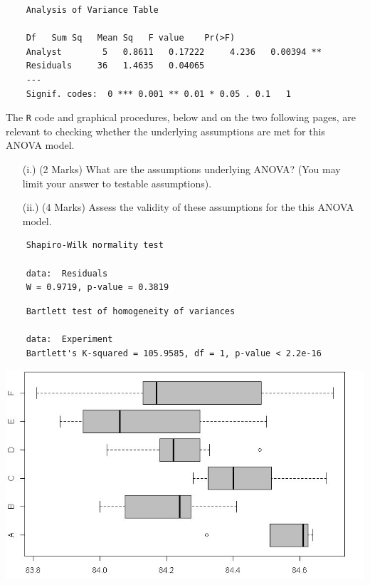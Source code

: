 \documentclass[a4paper,12pt]{article}
\begin{document}
\begin{framed}
	\begin{verbatim}
	Analysis of Variance Table
	
	Df   Sum Sq   Mean Sq   F value    Pr(>F)
	Analyst        5   0.8611   0.17222     4.236   0.00394 **
	Residuals     36   1.4635   0.04065
	---
	Signif. codes:  0 *** 0.001 ** 0.01 * 0.05 . 0.1   1
	\end{verbatim}
\end{framed}
\noindent The \texttt{R} code and graphical procedures, below and on the two following pages, are relevant to checking whether the underlying assumptions are met for this ANOVA model.
\begin{itemize}
	\item[(i.)] (2 Marks) What are the assumptions underlying ANOVA? (You may limit your answer to testable assumptions).
	\item[(ii.)] (4 Marks)  Assess the validity of these assumptions for the this ANOVA model.
\end{itemize}
\begin{framed}
	\begin{verbatim}
	Shapiro-Wilk normality test
	
	data:  Residuals
	W = 0.9719, p-value = 0.3819
	\end{verbatim}
\end{framed}
\begin{framed}
	\begin{verbatim}
	Bartlett test of homogeneity of variances
	
	data:  Experiment
	Bartlett's K-squared = 105.9585, df = 1, p-value < 2.2e-16
	\end{verbatim}
\end{framed}
\begin{center}
	\includegraphics[scale=0.59]{ExamQ5boxplot}
\end{center}
	
\end{document}
